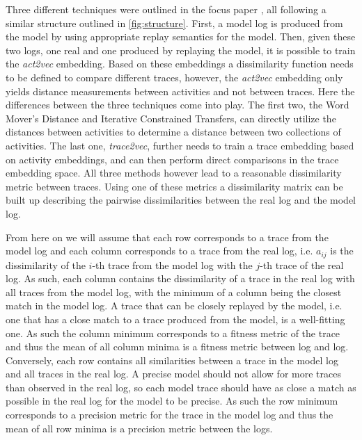 \documentclass[runningheads]{template/llncs}
\begin{document}
Three different techniques were outlined in the focus paper \cite{PBWe20}, all following a similar structure outlined in \cref{fig:structure}.
First, a model log is produced from the model by using appropriate replay semantics for the model.
Then, given these two logs, one real and one produced by replaying the model, it is possible to train the \emph{act2vec} \cite{KBWe18} embedding.
Based on these embeddings a dissimilarity function needs to be defined to compare different traces, however, the \emph{act2vec} embedding only yields distance measurements between activities and not between traces.
Here the differences between the three techniques come into play.
The first two, the Word Mover's Distance \cite{KSKW15} and Iterative Constrained Transfers, can directly utilize the distances between activities to determine a distance between two collections of activities.
The last one, \emph{trace2vec}, further needs to train a trace embedding based on activity embeddings, and can then perform direct comparisons in the trace embedding space.
All three methods however lead to a reasonable dissimilarity metric between traces.
Using one of these metrics a dissimilarity matrix can be built up describing the pairwise dissimilarities between the real log and the model log.

From here on we will assume that each row corresponds to a trace from the model log and each column corresponds to a trace from the real log, i.e. $a_{ij}$ is the dissimilarity of the $i$-th trace from the model log with the $j$-th trace of the real log.
As such, each column contains the dissimilarity of a trace in the real log with all traces from the model log, with the minimum of a column being the closest match in the model log.
A trace that can be closely replayed by the model, i.e. one that has a close match to a trace produced from the model, is a well-fitting one.
As such the column minimum corresponds to a fitness metric of the trace and thus the mean of all column minima is a fitness metric between log and log.
Conversely, each row contains all similarities between a trace in the model log and all traces in the real log.
A precise model should not allow for more traces than observed in the real log, so each model trace should have as close a match as possible in the real log for the model to be precise.
As such the row minimum corresponds to a precision metric for the trace in the model log and thus the mean of all row minima is a precision metric between the logs.
\end{document}
